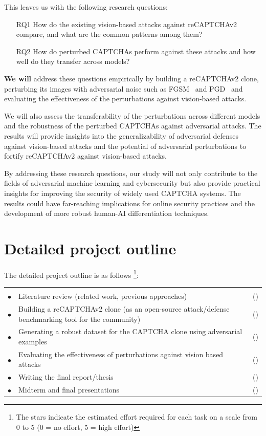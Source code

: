 \documentclass[a4paper,11pt]{article}
\newenvironment{reqlist}{\par \medskip \noindent \begin{tabular}{cp{0.83\textwidth}r} \\[-24pt]}{\end{tabular}}
\newcommand\req{\\ \smallskip \smallskip \hspace{0.24cm} $\bullet$\hspace{-0.2cm} & }
\newcounter{num}
\newcommand\effort[1]{\mbox{(\forloop{num}{0}{\value{num} < #1}{$\star$})}}
\begin{document}
This leaves us with the following research questions:

\begin{enumerate}
    \item[RQ1] How do the existing vision-based attacks against reCAPTCHAv2 compare, and what are the common patterns among them?
    \item[RQ2] How do perturbed CAPTCHAs perform against these attacks and how well do they transfer across models?
\end{enumerate}

\bigskip

\textbf{We will} address these questions empirically by building a reCAPTCHAv2 clone, perturbing its images with adversarial noise
such as FGSM~\cite{goodfellow2014explaining} and PGD~\cite{madry2017towards} and evaluating the effectiveness of the perturbations against vision-based attacks.

We will also assess the transferability of the perturbations across different models and the robustness of the perturbed CAPTCHAs against adversarial attacks. The results will provide insights into the generalizability of adversarial defenses against vision-based attacks and the potential of adversarial perturbations to fortify reCAPTCHAv2 against vision-based attacks.

By addressing these research questions, our study will not only contribute to the fields of adversarial machine learning and cybersecurity but also provide practical insights for improving the security of widely used CAPTCHA systems. The results could have far-reaching implications for online security practices and the development of more robust human-AI differentiation techniques.

\section*{Detailed project outline}

The detailed project outline is as follows \footnote{The stars indicate the estimated effort required for each task on a scale from 0 to 5 (0 = no effort, 5 = high effort)}:

\begin{reqlist}
	\req Literature review (related work, previous approaches) & \effort{3}

    \req Building a reCAPTCHAv2 clone (as an open-source attack/defense benchmarking tool for the community) & \effort{4}
    \req Generating a robust dataset for the CAPTCHA clone using adversarial examples & \effort{3}
    \req Evaluating the effectiveness of perturbations against vision based attacks & \effort{3}
    \req Writing the final report/thesis & \effort{4}
	\req Midterm and final presentations & \effort{3}
\end{reqlist}
\end{document}
